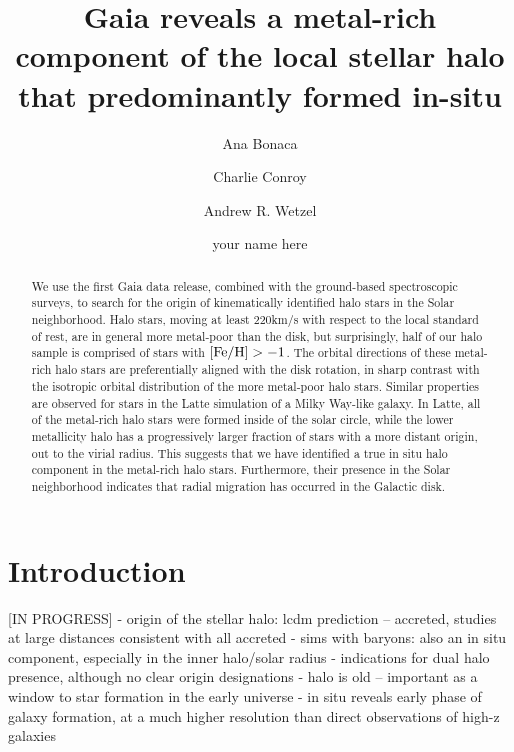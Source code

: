 \documentclass[apj, twocolappendix, numberedappendix, appendixfloats]{emulateapj}
\begin{document}
\title{Gaia reveals a metal-rich component of the local stellar halo that predominantly formed in-situ}
\author{Ana Bonaca}
\author{Charlie Conroy}
\author{Andrew R. Wetzel}
\author{your name here}


\begin{abstract}
We use the first Gaia data release, combined with the ground-based spectroscopic surveys, to search for the origin of kinematically identified halo stars in the Solar neighborhood.
Halo stars, moving at least 220\;km/s with respect to the local standard of rest, are in general more metal-poor than the disk, but surprisingly, half of our halo sample is comprised of stars with $\rm[Fe/H]>-1$.
The orbital directions of these metal-rich halo stars are preferentially aligned with the disk rotation, in sharp contrast with the isotropic orbital distribution of the more metal-poor halo stars.
Similar properties are observed for stars in the Latte simulation of a Milky Way-like galaxy.
In Latte, all of the metal-rich halo stars were formed inside of the solar circle, while the lower metallicity halo has a progressively larger fraction of stars with a more distant origin, out to the virial radius.
This suggests that we have identified a true in situ halo component in the metal-rich halo stars.
Furthermore, their presence in the Solar neighborhood indicates that radial migration has occurred in the Galactic disk.
\end{abstract}
\maketitle

\section{Introduction}
[IN PROGRESS]
- origin of the stellar halo: lcdm prediction -- accreted, studies at large distances consistent with all accreted
- sims with baryons: also an in situ component, especially in the inner halo/solar radius
- indications for dual halo presence, although no clear origin designations
- halo is old -- important as a window to star formation in the early universe
- in situ reveals early phase of galaxy formation, at a much higher resolution than direct observations of high-z galaxies
\end{document}
